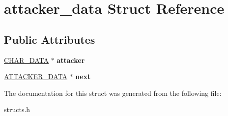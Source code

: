 \hypertarget{structattacker__data}{\section{attacker\-\_\-data Struct Reference}
\label{structattacker__data}
}
\subsection*{Public Attributes}
\begin{DoxyCompactItemize}
\item 
\hypertarget{structattacker__data_ae3e5412279eb6e9448444b55d91b99ef}{\hyperlink{structchar__data}{C\-H\-A\-R\-\_\-\-D\-A\-T\-A} $\ast$ {\bfseries attacker}}\label{structattacker__data_ae3e5412279eb6e9448444b55d91b99ef}

\item 
\hypertarget{structattacker__data_a7e1f3346555d66902c72ded2c763c039}{\hyperlink{structattacker__data}{A\-T\-T\-A\-C\-K\-E\-R\-\_\-\-D\-A\-T\-A} $\ast$ {\bfseries next}}\label{structattacker__data_a7e1f3346555d66902c72ded2c763c039}

\end{DoxyCompactItemize}


The documentation for this struct was generated from the following file\-:\begin{DoxyCompactItemize}
\item 
structs.\-h\end{DoxyCompactItemize}
